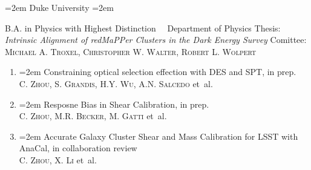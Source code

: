 \documentclass{scrartcl}
\newcommand{\MarginText}[1]{\marginpar{\raggedleft\itshape\small#1}} %
\newlength{\datebox}\settowidth{\datebox}{Spring 2011} %
\newcommand{\NewEntry}[3]{\noindent\hangindent=2em\hangafter=0 \parbox{\datebox}{\small \textit{#1}}\hspace{1.5em} #2 #3 %
\vspace{0.5em}} %
\newcommand{\School}[1]{\noindent\hangindent=2em\hangafter=0 #1  %
\vspace{0.5em}} %
\newcommand{\paper}[1]{\noindent\hangindent=2em\hangafter=0 \footnotesize #1  %
\vspace{0.5em}} %
\newcommand{\Description}[1]{\hangindent=2em\hangafter=0\noindent\raggedright\footnotesize{#1}\par\normalsize\vspace{1em}} %
\begin{document}
\begin{cv}{}
    \School{Duke University} \newline
    \Description{\MarginText{2020}B.A. in Physics with Highest Distinction\ \  \newline
        Department of Physics \newline
        Thesis: \textit{Intrinsic Alignment of redMaPPer Clusters in the Dark Energy
            Survey}\newline
        Comittee:  \textsc{Michael A. Troxel}, \textsc{Christopher W. Walter}, \textsc{Robert L. Wolpert} }








    \vspace{1em} %

    \vspace{0.2em}
    \begin{enumerate}
    \item \paper{Constraining optical selection effection with DES and SPT, in prep.}\\
    \textsc{C. Zhou, S. Grandis, H.Y. Wu, A.N. Salcedo} et~al.

    \item \paper{Resposne Bias in Shear Calibration, in prep.}\\
    \textsc{C. Zhou, M.R. Becker, M. Gatti} et~al.

    \item \paper{Accurate Galaxy Cluster Shear and Mass Calibration for LSST with AnaCal, in collaboration review}\\
    \textsc{C. Zhou, X. Li} et~al.


\end{enumerate}
\end{cv}
\end{document}
